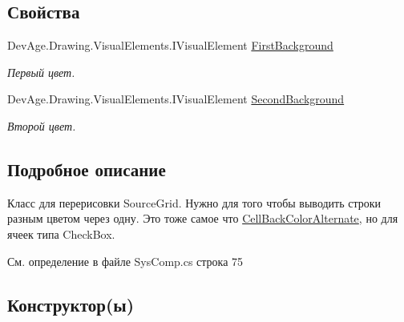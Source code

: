 \subsection*{Свойства}
\begin{DoxyCompactItemize}
\item 
Dev\+Age.\+Drawing.\+Visual\+Elements.\+I\+Visual\+Element \mbox{\hyperlink{class_f_b_a_1_1_check_box_back_color_alternate_a495d850ff491c88c99a2b7874a9ddef0}{First\+Background}}
\begin{DoxyCompactList}\small\item\em Первый цвет. \end{DoxyCompactList}\item 
Dev\+Age.\+Drawing.\+Visual\+Elements.\+I\+Visual\+Element \mbox{\hyperlink{class_f_b_a_1_1_check_box_back_color_alternate_a09a47acdc2b2db05505324e076cc7973}{Second\+Background}}
\begin{DoxyCompactList}\small\item\em Второй цвет. \end{DoxyCompactList}\end{DoxyCompactItemize}


\subsection{Подробное описание}
Класс для перерисовки Source\+Grid. Нужно для того чтобы выводить строки разным цветом через одну. Это тоже самое что \mbox{\hyperlink{class_f_b_a_1_1_cell_back_color_alternate}{Cell\+Back\+Color\+Alternate}}, но для ячеек типа Check\+Box. 



См. определение в файле Sys\+Comp.\+cs строка 75



\subsection{Конструктор(ы)}
\mbox{\label{class_f_b_a_1_1_check_box_back_color_alternate_a3c5dbb6578257fb63b2193bad6126e7b}} 
